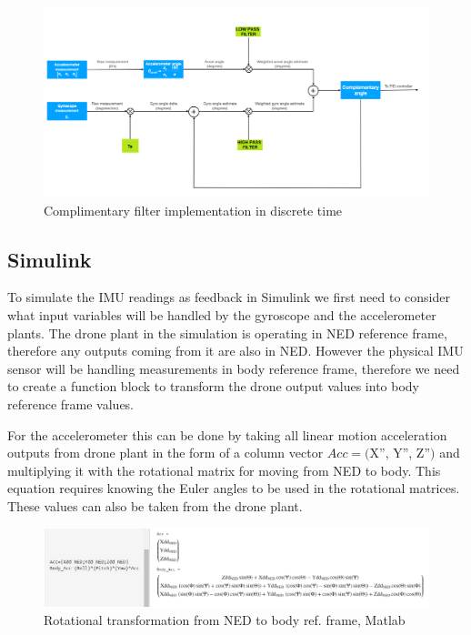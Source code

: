 \begin{figure}[H]
    \begin{center}
    \includegraphics[scale = 0.5]{pictures/IMU/complementary.png}
    \end{center}
    \caption{Complimentary filter implementation in discrete time }
    \label{fig:my_label}
\end{figure}

\subsection{Simulink}

To simulate the IMU readings as feedback in Simulink we first need to consider what input variables will be handled by the gyroscope and the accelerometer plants. The drone plant in the simulation is operating in NED reference frame, therefore any outputs coming from it are also in NED. However the physical IMU sensor will be handling measurements in body reference frame, therefore we need to create a function block to transform the drone output values into body reference frame values. 

For the accelerometer this can be done by taking all linear motion acceleration outputs from drone plant in the form of a column vector $Acc=($X'', Y'', Z''$)$ and multiplying it with the rotational matrix for moving from NED to body. This equation requires knowing the Euler angles to be used in the rotational matrices. These values can also be taken from the drone plant.


\begin{figure}[H]
    \begin{center}
    \includegraphics[scale = 0.5]{pictures/IMU/NED_to_body_acc.png}
    \end{center}
    \caption{Rotational transformation from NED to body ref. frame, Matlab}
    \label{fig:my_label}
\end{figure}

